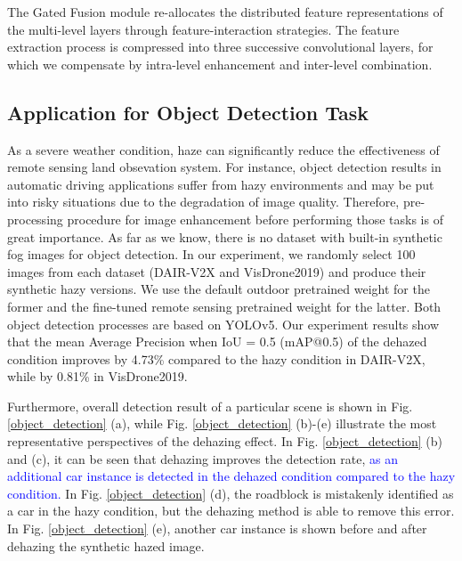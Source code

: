 \documentclass[lettersize,journal]{IEEEtran}
\begin{document}
The Gated Fusion module re-allocates the distributed feature representations of the multi-level layers through feature-interaction strategies. The feature extraction process is compressed into three successive convolutional layers, for which we compensate by intra-level enhancement and inter-level combination.  

\subsection{Application for Object Detection Task}
As a severe weather condition, haze can significantly reduce the effectiveness of remote sensing land obsevation system. For instance, object detection results in automatic driving applications suffer from hazy environments and may be put into risky situations due to the degradation of image quality. Therefore, pre-processing procedure for image enhancement before performing those tasks is of great importance. As far as we know, there is no dataset with built-in synthetic fog images for object detection. In our experiment, we randomly select 100 images from each dataset (DAIR-V2X and VisDrone2019) and produce their synthetic hazy versions. We use the default outdoor pretrained weight for the former and the fine-tuned remote sensing pretrained weight for the latter. Both object detection processes are based on YOLOv5. Our experiment results show that the mean Average Precision when IoU = 0.5 (mAP@0.5) of the dehazed condition improves by 4.73\% compared to the hazy condition in DAIR-V2X, while by 0.81\% in VisDrone2019.

Furthermore, overall detection result of a particular scene is shown in Fig. \ref{object_detection} (a), while Fig. \ref{object_detection} (b)-(e) illustrate the most representative perspectives of the dehazing effect. In Fig. \ref{object_detection} (b) and (c), it can be seen that dehazing improves the detection rate, \textcolor{blue}{as an additional car instance is detected in the dehazed condition compared to the hazy condition.} In Fig. \ref{object_detection} (d), the roadblock is mistakenly identified as a car in the hazy condition, but the dehazing method is able to remove this error. In Fig. \ref{object_detection} (e), another car instance is shown before and after dehazing the synthetic hazed image. 
\end{document}
